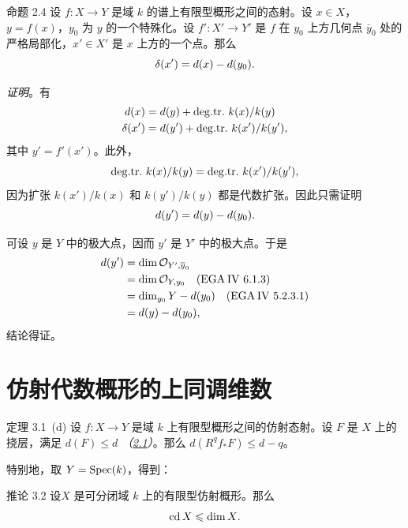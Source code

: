 \begin{enonce*}{命题 2.4}
设 $f:X\rightarrow Y$ 是域 $k$ 的谱上有限型概形之间的态射。设 $x\in X$，$y=f(x)$，$y_{0}$ 为 $y$ 的一个特殊化。设 $f':X'\rightarrow Y'$ 是 $f$ 在 $y_{0}$ 上方几何点 $\bar{y}_{0}$ 处的严格局部化，$x'\in X'$ 是 $x$ 上方的一个点。那么
$$
\delta(x')=d(x)-d(y_{0}){\quoi}.
$$
\end{enonce*}

\noindent
\emph{证明}。\pageoriginale 有
\begin{align*}
d(x) &= d(y)+\degtr k(x)/k(y)\\
\delta(x') &= d(y')+\degtr k(x')/k(y'){\quoi},
\end{align*}
其中 $y'=f'(x')$。此外，
$$
\degtr k(x)/k(y)=\degtr k(x')/k(y'){\quoi},
$$
因为扩张 $k(x')/k(x)$ 和 $k(y')/k(y)$ 都是代数扩张。因此只需证明
$$
d(y')=d(y)-d(y_{0}){\quoi}.
$$

可设 $y$ 是 $Y$ 中的极大点，因而 $y'$ 是 $Y'$ 中的极大点。于是
\begin{align*}
d(y') &= \dim \Oo_{Y',\bar{y}_{0}}\\
      &= \dim \Oo_{Y,y_{0}}\quad \text{\rm (\EGA IV 6.1.3)}\\
      &= \sisi{\dim Y}{\dim_{y_0} Y} -d(y_{0})\quad \text{\rm (\EGA IV 5.2.3.1)}\\
      &= d(y)-d(y_{0}){\quoi},
\end{align*}
结论得证。

\section{仿射代数概形的上同调维数}

\begin{enonce*}{定理 3.1~(d)}
设 $f:X\rightarrow Y$ 是域 $k$ 上有限型概形之间的仿射态射。设 $F$ 是 $X$ 上的挠层，满足 $d(F)\leq d$ \emph{（\cf \hyperref[XIV.subsec2.1]{2.1}）}。那么 $d(R^{q}f_{\ast}F)\leq d-q$。
\end{enonce*}

特别地，取 $Y=\Spec(k)$，得到：

\begin{enonce*}{推论 3.2}
设\pageoriginale $X$ 是可分闭域 $k$ 上的有限型仿射概形。那么
$$
\cd X\leq \dim X{\quoi}.
$$
\end{enonce*}

